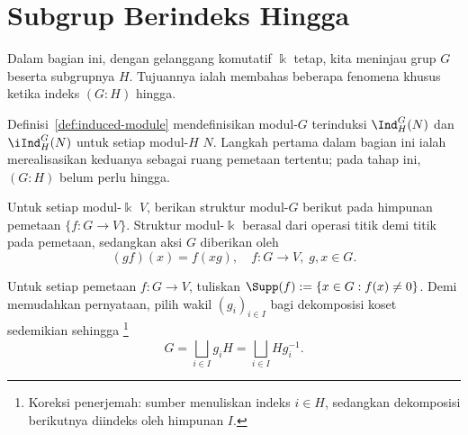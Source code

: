 
\section{Subgrup Berindeks Hingga}\label{sec:group-finite-index}
\hypertarget{o014.aljabr2.chapter6.finite-index-subgroups}{ }
Dalam bagian ini, dengan gelanggang komutatif $\Bbbk$ tetap, kita meninjau grup
$G$ beserta subgrupnya $H$. Tujuannya ialah membahas beberapa fenomena khusus
ketika indeks $(G:H)$ hingga.

Definisi~\ref{def:induced-module} mendefinisikan modul-$G$ terinduksi
$\Ind^G_H(N)$ dan $\iInd^G_H(N)$ untuk setiap modul-$H$ $N$. Langkah pertama
dalam bagian ini ialah merealisasikan keduanya sebagai ruang pemetaan
tertentu; pada tahap ini, $(G:H)$ belum perlu hingga.

Untuk setiap modul-$\Bbbk$ $V$, berikan struktur modul-$G$ berikut pada
himpunan pemetaan $\{f:G\to V\}$. Struktur modul-$\Bbbk$ berasal dari operasi
titik demi titik pada pemetaan, sedangkan aksi $G$ diberikan oleh
\[ (g f)(x) = f(xg), \quad f: G \to V, \; g, x \in G. \]

Untuk setiap pemetaan $f:G\to V$, tuliskan
$\Supp(f):=\{x\in G:f(x)\neq0\}$. Demi memudahkan pernyataan, pilih wakil
$(g_i)_{i\in I}$ bagi dekomposisi koset sedemikian sehingga
\footnote{Koreksi penerjemah: sumber menuliskan indeks $i\in H$, sedangkan
dekomposisi berikutnya diindeks oleh himpunan $I$.}
\[ G = \bigsqcup_{i \in I} g_i H = \bigsqcup_{i \in I} Hg_i^{-1}. \]

